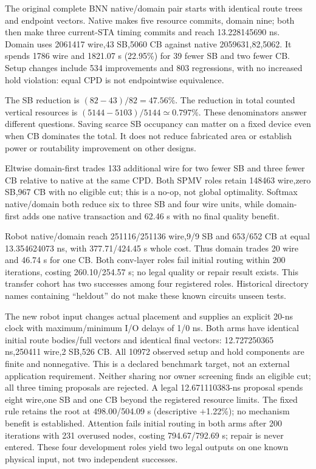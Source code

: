 \documentclass[conference,10pt]{IEEEtran}
\begin{document}
The original complete BNN native/domain pair starts with identical route trees and endpoint vectors. Native makes five resource commits, domain nine; both then make three current-STA timing commits and reach 13.228145690 ns. Domain uses 2061417 wire,43 SB,5060 CB against native 2059631,82,5062. It spends 1786 wire and 1821.07 s (22.95\%) for 39 fewer SB and two fewer CB. Setup changes include 534 improvements and 803 regressions, with no increased hold violation: equal CPD is not endpointwise equivalence.

The SB reduction is $(82-43)/82=47.56\%$. The reduction in total counted vertical resources is $(5144-5103)/5144\simeq 0.797\%$. These denominators answer different questions. Saving scarce SB occupancy can matter on a fixed device even when CB dominates the total. It does not reduce fabricated area or establish power or routability improvement on other designs.

Eltwise domain-first trades 133 additional wire for two fewer SB and three fewer CB relative to native at the same CPD. Both SPMV roles retain 148463 wire,zero SB,967 CB with no eligible cut; this is a no-op, not global optimality. Softmax native/domain both reduce six to three SB and four wire units, while domain-first adds one native transaction and 62.46 s with no final quality benefit.

Robot native/domain reach 251116/251136 wire,9/9 SB and 653/652 CB at equal 13.354624073 ns, with 377.71/424.45 s whole cost. Thus domain trades 20 wire and 46.74 s for one CB. Both conv-layer roles fail initial routing within 200 iterations, costing 260.10/254.57 s; no legal quality or repair result exists. This transfer cohort has two successes among four registered roles. Historical directory names containing ``heldout'' do not make these known circuits unseen tests.

The new robot input changes actual placement and supplies an explicit 20-ns clock with maximum/minimum I/O delays of 1/0 ns. Both arms have identical initial route bodies/full vectors and identical final vectors: 12.727250365 ns,250411 wire,2 SB,526 CB. All 10972 observed setup and hold components are finite and nonnegative. This is a declared benchmark target, not an external application requirement. Neither sharing nor owner screening finds an eligible cut; all three timing proposals are rejected. A legal 12.671110383-ns proposal spends eight wire,one SB and one CB beyond the registered resource limits. The fixed rule retains the root at 498.00/504.09 s (descriptive +1.22\%); no mechanism benefit is established. Attention fails initial routing in both arms after 200 iterations with 231 overused nodes, costing 794.67/792.69 s; repair is never entered. These four development roles yield two legal outputs on one known physical input, not two independent successes.
\end{document}
